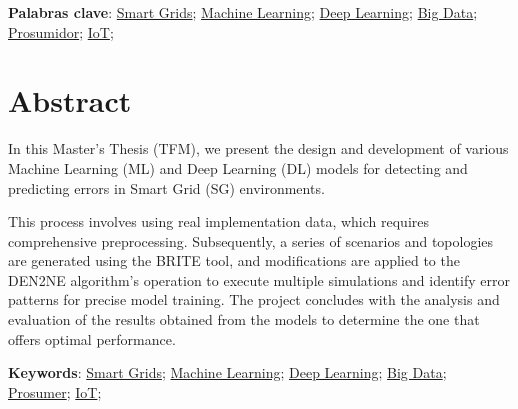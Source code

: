 \vspace{1cm}

\textbf{Palabras clave}: 
\href{https://scholar.google.com/scholar?q=smartgrids}{Smart Grids}; 
\href{https://scholar.google.com/scholar?hl=es&as_sdt=0,5&q=machine+learning}{Machine Learning};
\href{https://scholar.google.com/scholar?hl=es&as_sdt=0%2C5&q=deep+learning&btnG=}{Deep Learning}; 
\href{https://scholar.google.com/scholar?hl=es&as_sdt=0%2C5&q=big+data&btnG=}{Big Data};
\href{https://scholar.google.com/scholar?hl=es&as_sdt=0%2C5&q=prosumidor&btnG=}{Prosumidor}; 
\href{https://scholar.google.com/scholar?hl=es&as_sdt=0%2C5&q=iot&btnG=}{IoT}; 

\cleardoublepage %



\chapter{Abstract}
\thispagestyle{empty}

In this Master's Thesis (TFM), we present the design and development of various Machine Learning (ML) and Deep Learning (DL) models for detecting and predicting errors in Smart Grid (SG) environments. 

\vspace{3mm}

This process involves using real implementation data, which requires comprehensive preprocessing. Subsequently, a series of scenarios and topologies are generated using the BRITE tool, and modifications are applied to the DEN2NE algorithm's operation to execute multiple simulations and identify error patterns for precise model training. The project concludes with the analysis and evaluation of the results obtained from the models to determine the one that offers optimal performance.

\vspace{1cm}

\textbf{Keywords}: 
\href{https://scholar.google.com/scholar?q=smartgrids}{Smart Grids}; 
\href{https://scholar.google.com/scholar?hl=es&as_sdt=0,5&q=machine+learning}{Machine Learning};
\href{https://scholar.google.com/scholar?hl=es&as_sdt=0%2C5&q=deep+learning&btnG=}{Deep Learning}; 
\href{https://scholar.google.com/scholar?hl=es&as_sdt=0%2C5&q=big+data&btnG=}{Big Data};
\href{https://scholar.google.com/scholar?hl=es&as_sdt=0%2C5&q=prosumer&btnG=}{Prosumer}; 
\href{https://scholar.google.com/scholar?hl=es&as_sdt=0%2C5&q=iot&btnG=}{IoT}; 

